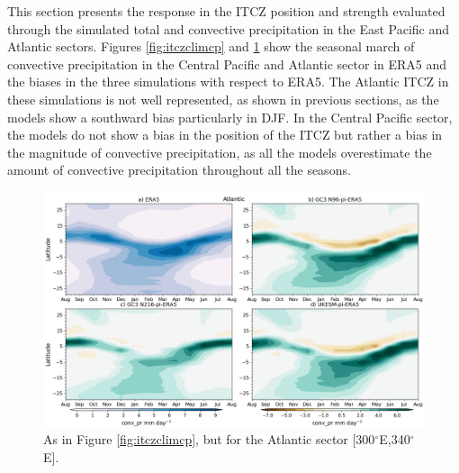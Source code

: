This section presents the response in the ITCZ position and strength evaluated through the simulated total and convective precipitation in the East Pacific and Atlantic sectors. 
Figures \ref{fig:itczclimcp} and \ref{fig:itczclimatl} show the seasonal march of convective precipitation in the Central Pacific and Atlantic sector in ERA5 and the biases in the three simulations with respect to ERA5. The Atlantic ITCZ in these simulations is not well represented, as shown in previous sections, as the models show a southward bias particularly in DJF. 
In the Central Pacific sector, the models do not show a bias in the position of the ITCZ but rather a bias in the magnitude of convective precipitation, as all the models overestimate the amount of convective precipitation throughout all the seasons. 
 



\begin{figure}[t!]
\centering
 \includegraphics[width=\linewidth]{figures/climcmip_bconv_pratl.png}
\caption[ITCZ seasonal cycle in the Atlantic Sector.]{ As in Figure \ref{fig:itczclimcp}, but for the Atlantic sector [300$^\circ$E,340$^\circ$E]. }
\label{fig:itczclimatl}
\end{figure}

